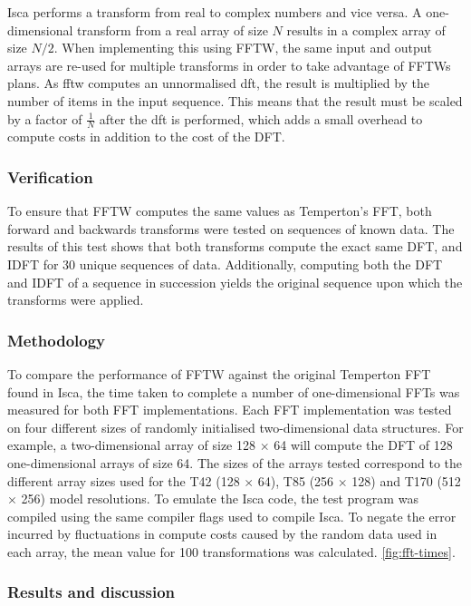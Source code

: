 \documentclass[a4paper,11pt]{report}
\begin{document}
\par
Isca performs a transform from real to complex numbers and vice versa. A one-dimensional transform from a real array of size $N$ results in a complex array of size $N/2$. When implementing this using FFTW, the same input and output arrays are re-used for multiple transforms in order to take advantage of FFTWs plans. As \gls{fftw} computes an unnormalised \gls{dft}, the result is multiplied by the number of items in the input sequence. This means that the result must be scaled by a factor of $\frac{1}{N}$ after the \gls{dft} is performed, which adds a small overhead to compute costs in addition to the cost of the DFT.  

\subsubsection{Verification}
To ensure that FFTW computes the same values as Temperton's FFT, both forward and backwards transforms were tested on sequences of known data. The results of this test shows that both transforms compute the exact same DFT, and IDFT for 30 unique sequences of data. Additionally, computing both the DFT and IDFT of a sequence in succession yields the original sequence upon which the transforms were applied.

\subsubsection{Methodology}

\par
To compare the performance of FFTW against the original Temperton FFT found in Isca, the time taken to complete a number of one-dimensional FFTs was measured for both FFT implementations. Each FFT implementation was tested on four different sizes of randomly initialised two-dimensional data structures. For example, a two-dimensional array of size 128 $\times$ 64 will compute the DFT of 128 one-dimensional arrays of size 64. The sizes of the arrays tested correspond to the different array sizes used for the T42 (128 $\times$ 64), T85 (256 $\times$ 128) and T170 (512 $\times$ 256) model resolutions. To emulate the Isca code, the test program was compiled using the same compiler flags used to compile Isca. To negate the error incurred by fluctuations in compute costs caused by the random data used in each array, the mean value for 100 transformations was calculated.  \ref{fig:fft-times}.

\subsubsection{Results and discussion}
\end{document}
